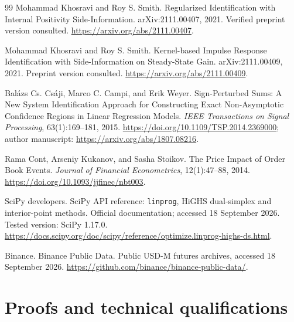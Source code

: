\documentclass[11pt,a4paper]{article}
\theoremstyle{definition}
\theoremstyle{remark}
\begin{document}
\begin{thebibliography}{99}
Mohammad Khosravi and Roy S. Smith.
\newblock Regularized Identification with Internal Positivity Side-Information.
\newblock arXiv:2111.00407, 2021. Verified preprint version consulted.
\newblock \url{https://arxiv.org/abs/2111.00407}.

Mohammad Khosravi and Roy S. Smith.
\newblock Kernel-based Impulse Response Identification with Side-Information on Steady-State Gain.
\newblock arXiv:2111.00409, 2021. Preprint version consulted.
\newblock \url{https://arxiv.org/abs/2111.00409}.

Bal\'azs Cs. Cs\'aji, Marco C. Campi, and Erik Weyer.
\newblock Sign-Perturbed Sums: A New System Identification Approach for Constructing Exact Non-Asymptotic Confidence Regions in Linear Regression Models.
\newblock \emph{IEEE Transactions on Signal Processing}, 63(1):169--181, 2015.
\newblock \url{https://doi.org/10.1109/TSP.2014.2369000}; author manuscript: \url{https://arxiv.org/abs/1807.08216}.

Rama Cont, Arseniy Kukanov, and Sasha Stoikov.
\newblock The Price Impact of Order Book Events.
\newblock \emph{Journal of Financial Econometrics}, 12(1):47--88, 2014.
\newblock \url{https://doi.org/10.1093/jjfinec/nbt003}.

SciPy developers.
\newblock SciPy API reference: \texttt{linprog}, HiGHS dual-simplex and interior-point methods.
\newblock Official documentation; accessed 18 September 2026. Tested version: SciPy 1.17.0.
\newblock \url{https://docs.scipy.org/doc/scipy/reference/optimize.linprog-highs-ds.html}.

Binance.
\newblock Binance Public Data.
\newblock Public USD-M futures archives, accessed 18 September 2026.
\newblock \url{https://github.com/binance/binance-public-data/}.
\end{thebibliography}
\endgroup

\clearpage
\appendix
\section{Proofs and technical qualifications}
\label{app:proofs}
\end{document}
